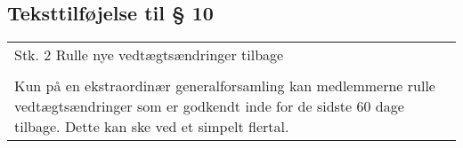 \documentclass[a4paper,11pt]{report}
\newenvironment{quotationb}%
{\begin{tabular}{|p{10cm}}}%
{\\\end{tabular}}
\begin{document}
\begin{appendices}
\section*{Teksttilføjelse til § 10}

\begin{quotationb}
Stk. 2 Rulle nye vedtægtsændringer tilbage\\
\\
Kun på en ekstraordinær generalforsamling kan medlemmerne rulle
vedtægtsændringer som er godkendt inde for de sidste 60 dage tilbage.  Dette kan
ske ved et simpelt flertal.
\end{quotationb}

\end{appendices}
\end{document}
